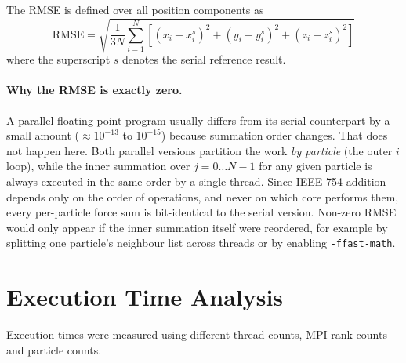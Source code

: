 \documentclass[11pt,a4paper]{article}
\begin{document}
The RMSE is defined over all position components as
\begin{equation}
\text{RMSE} = \sqrt{\frac{1}{3N}\sum_{i=1}^{N}
\left[(x_i - x_i^{s})^2 + (y_i - y_i^{s})^2 + (z_i - z_i^{s})^2\right]}
\end{equation}
where the superscript $s$ denotes the serial reference result.

\paragraph{Why the RMSE is exactly zero.}
A parallel floating-point program usually differs from its serial counterpart
by a small amount ($\approx 10^{-13}$ to $10^{-15}$) because summation order
changes. That does not happen here. Both parallel versions partition the work
\emph{by particle} (the outer $i$ loop), while the inner summation over
$j = 0 \ldots N-1$ for any given particle is always executed in the same order
by a single thread. Since IEEE-754 addition depends only on the order of
operations, and never on which core performs them, every per-particle force sum
is bit-identical to the serial version. Non-zero RMSE would only appear if the
inner summation itself were reordered, for example by splitting one particle's
neighbour list across threads or by enabling \texttt{-ffast-math}.

\section{Execution Time Analysis}

Execution times were measured using different thread counts, MPI rank counts
and particle counts.
\end{document}
